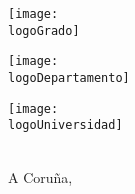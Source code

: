 \begin{titlepage}
	\noindent\hspace*{\centeroffset}
	\begin{minipage}{\textwidth}
		\centering
		\noindent\hspace*{\centeroffset}
		\begin{center}
			{\texttt{[image: \\logoGrado]}}\\
			{\raggedleft\miGrado}
		\end{center}
		\vspace*{2em}
		\centering
		\noindent\hspace*{\centeroffset}
		\begin{minipage}[l]{6cm}
			\texttt{[image: \\logoDepartamento]}
		\end{minipage}
		\begin{minipage}[r]{6cm}
			\texttt{[image: \\logoUniversidad]}
		\end{minipage}
		\\[1cm]
		A Coruña, \Hoy
	\end{minipage}


\end{titlepage}

\restoregeometry


